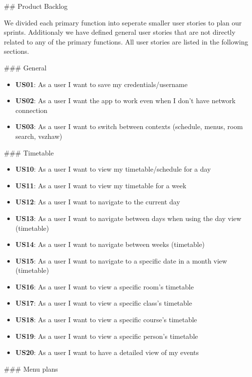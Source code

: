 \begin{markdown}
## Product Backlog

We divided each primary function into seperate smaller user stories to plan our sprints. Additionaly we have defined general user stories that are not directly related to any of the primary functions. All user stories are listed in the following sections.

### General

\begin{itemize}
  \item \textbf{US01}: As a user I want to save my credentials/username
  \item \textbf{US02}: As a user I want the app to work even when I don't have network connection
  \item \textbf{US03}: As a user I want to switch between contexts (schedule, menus, room search, vszhaw)
\end{itemize}

### Timetable

\begin{itemize}
  \item \textbf{US10}: As a user I want to view my timetable/schedule for a day
  \item \textbf{US11}: As a user I want to view my timetable for a week
  \item \textbf{US12}: As a user I want to navigate to the current day
  \item \textbf{US13}: As a user I want to navigate between days when using the day view (timetable)
  \item \textbf{US14}: As a user I want to navigate between weeks (timetable)
  \item \textbf{US15}: As a user I want to navigate to a specific date in a month view (timetable)
  \item \textbf{US16}: As a user I want to view a specific room's timetable
  \item \textbf{US17}: As a user I want to view a specific class's timetable
  \item \textbf{US18}: As a user I want to view a specific course's timetable
  \item \textbf{US19}: As a user I want to view a specific person's timetable
  \item \textbf{US20}: As a user I want to have a detailed view of my events
\end{itemize}

### Menu plans


\end{markdown}

